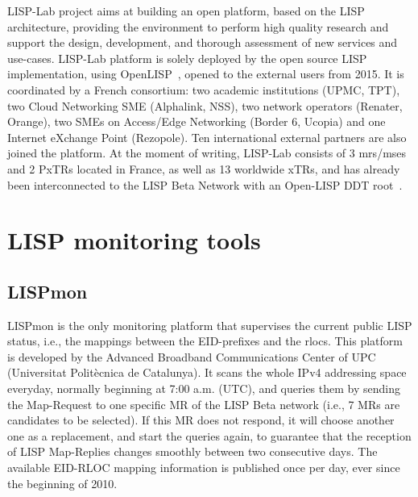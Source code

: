 LISP-Lab project aims at building an open platform, based on the LISP architecture, providing the environment to perform high quality research and support the design, development, and thorough assessment of new services and use-cases. LISP-Lab platform is solely deployed by the open source LISP implementation, using OpenLISP~\cite{OpenLISP}, opened to the external users from 2015. It is coordinated by a French consortium: two academic institutions (UPMC, TPT), two Cloud Networking SME (Alphalink, NSS), two network operators (Renater, Orange), two SMEs on Access/Edge Networking (Border 6, Ucopia) and one Internet eXchange Point (Rezopole). Ten international external partners are also joined the platform. At the moment of writing, LISP-Lab consists of 3 \acrshort{mr}s/\acrshort{ms}es and 2 PxTRs located in France, as well as 13 worldwide xTRs, and has already been interconnected to the LISP Beta Network with an Open-LISP DDT root~\cite{fuller2012lisp}.


\section{LISP monitoring tools}
\label{sec:monitor}

\subsection{LISPmon}
\label{subsec:implementation_LISPmon}

LISPmon is the only monitoring platform that supervises the current public LISP status, i.e., the mappings between the EID-prefixes and the \acrshort{rloc}s. This platform is developed by the Advanced Broadband Communications Center of UPC (Universitat Politècnica de Catalunya). It scans the whole IPv4 addressing space everyday, normally beginning at 7:00 a.m. (UTC), and queries them by sending the Map-Request to one specific MR of the LISP Beta network (i.e., 7 MRs are candidates to be selected). If this MR does not respond, it will choose another one as a replacement, and start the queries again, to guarantee that the reception of LISP Map-Replies changes smoothly %
between two consecutive days. The available EID-RLOC mapping information is published once per day, ever since the beginning of 2010.


